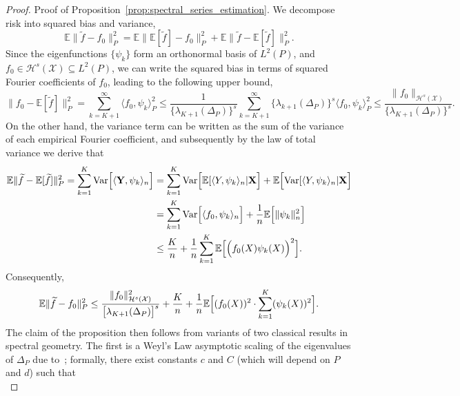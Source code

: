 \documentclass[aos]{imsart}
\theoremstyle{plain}
\theoremstyle{definition}
\theoremstyle{remark}
\newcommand{\Ebb}{\mathbb{E}}
\newcommand{\dotp}[2]{\langle #1, #2 \rangle}
\newcommand{\wt}[1]{\widetilde{#1}}
\newcommand{\mc}[1]{\mathcal{#1}}
\newcommand{\Var}{\mathrm{Var}}
\newcommand{\1}{\mathbf{1}}
\begin{document}
\begin{proof}{Proof of Proposition~\ref{prop:spectral_series_estimation}.}
We decompose risk into squared bias and variance,
\begin{equation}
\label{pf:spectral_series_estimation_0}
\Ebb \|\wt{f} - f_0\|_P^2 = \Ebb\| \Ebb[\wt{f}]  - f_0\|_P^2 + \Ebb\| \wt{f} - \Ebb[\wt{f}]\|_P^2.
\end{equation}
Since the eigenfunctions $\{\psi_k\}$ form an orthonormal basis of $L^2(P)$, and $f_0 \in \mc{H}^{s}(\mc{X}) \subseteq L^2(P)$, we can write the squared bias in terms of squared Fourier coefficients of $f_0$, leading to the following upper bound,
\begin{equation*}
\|f_0 - \Ebb[\wt{f}]\|_P^2 = \sum_{k = K + 1}^{\infty}  \dotp{f_0}{\psi_k}_P^2 \leq  \frac{1}{\{\lambda_{K + 1}(\Delta_P)\}^s} \sum_{k = K + 1}^{\infty} \{\lambda_{k + 1}(\Delta_P)\}^s \dotp{f_0}{\psi_k}_P^2 \leq \frac{\|f_0\|_{\mc{H}^s(\mc{X})}}{\{\lambda_{K + 1}(\Delta_P)\}^s}.
\end{equation*}
On the other hand, the variance term can be written as the sum of the variance of each empirical Fourier coefficient, and subsequently by the law of total variance we derive that
\begin{align}
\label{pf:spectral_series_estimation_2}
\Ebb\| \wt{f} - \Ebb[\wt{f}]\|_P^2 = \sum_{k = 1}^{K} \Var\Bigl[\dotp{{\bf Y}}{\psi_k}_n\Bigr] & = \sum_{k = 1}^{K} \Var\Bigl[\Ebb[\dotp{Y}{\psi_k}_n|{\bf X}\Bigr] + \Ebb\Bigl[\Var[\dotp{Y}{\psi_k}_n|{\bf X}\Bigr] \nonumber \\
& = \sum_{k = 1}^{K} \Var\Bigl[\dotp{f_0}{\psi_k}_n\Bigr] + \frac{1}{n}\Ebb\Bigl[\|\psi_k\|_n^2\Bigr] \nonumber \\
& \leq \frac{K}{n} + \frac{1}{n}\sum_{k = 1}^{K}\Ebb\Bigl[\Bigl(f_0(X)\psi_k(X)\Bigr)^2\Bigr].
\end{align}
Consequently,
\begin{equation}
\label{pf:spectral_series_estimation_1}
\Ebb \|\wt{f} - f_0\|_P^2 \leq \frac{\|f_0\|_{\mc{H}^s(\mc{X})}^2}{\bigl[\lambda_{K + 1}(\Delta_P)\bigr]^s} + \frac{K}{n} + \frac{1}{n}\Ebb\Bigl[(f_0(X))^2 \cdot \sum_{k = 1}^{K} (\psi_k(X))^2\Bigr].
\end{equation}
The claim of the proposition then follows from variants of two classical results in spectral geometry. The first is a Weyl's Law asymptotic scaling of the eigenvalues of $\Delta_P$ due to~\cite{dunlop2020}; formally, there exist constants $c$ and $C$ (which will depend on $P$ and $d$) such that
\begin{equation}

\end{equation}
\end{proof}
\end{document}
